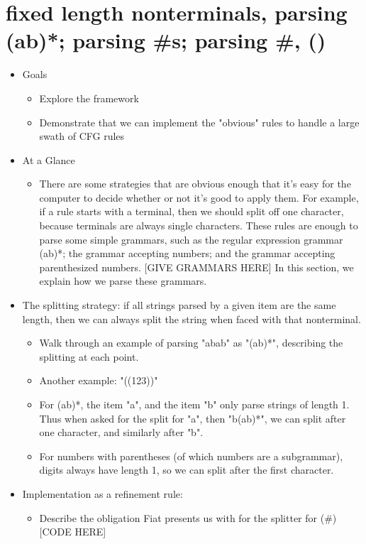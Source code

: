 \chapter{fixed length nonterminals, parsing (ab)*; parsing \#s; parsing \#, ()}
  \begin{itemize} \item  Goals
    \begin{itemize} \item  Explore the framework 
    \item  Demonstrate that we can implement the "obvious" rules to handle a large swath of CFG rules \end{itemize}
  \item  At a Glance
    \begin{itemize} \item  There are some strategies that are obvious enough that it's easy for the computer to decide whether or not it's good to apply them.  For example, if a rule starts with a terminal, then we should split off one character, because terminals are always single characters.  These rules are enough to parse some simple grammars, such as the regular expression grammar (ab)*; the grammar accepting numbers; and the grammar accepting parenthesized numbers.  {}[GIVE GRAMMARS HERE]  In this section, we explain how we parse these grammars. \end{itemize}
  \item  The splitting strategy: if all strings parsed by a given item are the same length, then we can always split the string when faced with that nonterminal.
    \begin{itemize} \item  Walk through an example of parsing "abab" as "(ab)*", describing the splitting at each point. 
    \item  Another example: "((123))" 
    \item  For (ab)*, the item "a", and the item "b" only parse strings of length 1.  Thus when asked for the split for "a", then "b(ab)*", we can split after one character, and similarly after "b".  
    \item  For numbers with parentheses (of which numbers are a subgrammar), digits always have length 1, so we can split after the first character. \end{itemize}
  \item  Implementation as a refinement rule:
    \begin{itemize} \item  Describe the obligation Fiat presents us with for the splitter for (\#) {}[CODE HERE] 

\end{itemize}
\end{itemize}

